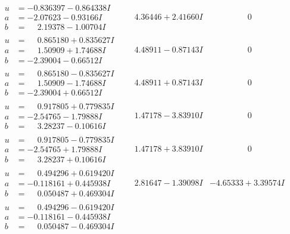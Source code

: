 \documentclass[1p]{elsarticle_modified}
\theoremstyle{definition}
\begin{document}
$$\begin{array}{c|c|c}
\begin{aligned}
u &= -0.836397 - 0.864338 I \\
a &= -2.07623 - 0.93166 I \\
b &= \phantom{-}2.19378 - 1.00704 I\end{aligned}
 & \phantom{-}4.36446 + 2.41660 I & \phantom{-0.000000 } 0 \\ \hline\begin{aligned}
u &= \phantom{-}0.865180 + 0.835627 I \\
a &= \phantom{-}1.50909 + 1.74688 I \\
b &= -2.39004 - 0.66512 I\end{aligned}
 & \phantom{-}4.48911 - 0.87143 I & \phantom{-0.000000 } 0 \\ \hline\begin{aligned}
u &= \phantom{-}0.865180 - 0.835627 I \\
a &= \phantom{-}1.50909 - 1.74688 I \\
b &= -2.39004 + 0.66512 I\end{aligned}
 & \phantom{-}4.48911 + 0.87143 I & \phantom{-0.000000 } 0 \\ \hline\begin{aligned}
u &= \phantom{-}0.917805 + 0.779835 I \\
a &= -2.54765 - 1.79888 I \\
b &= \phantom{-}3.28237 - 0.10616 I\end{aligned}
 & \phantom{-}1.47178 - 3.83910 I & \phantom{-0.000000 } 0 \\ \hline\begin{aligned}
u &= \phantom{-}0.917805 - 0.779835 I \\
a &= -2.54765 + 1.79888 I \\
b &= \phantom{-}3.28237 + 0.10616 I\end{aligned}
 & \phantom{-}1.47178 + 3.83910 I & \phantom{-0.000000 } 0 \\ \hline\begin{aligned}
u &= \phantom{-}0.494296 + 0.619420 I \\
a &= -0.118161 + 0.445938 I \\
b &= \phantom{-}0.050487 + 0.469304 I\end{aligned}
 & \phantom{-}2.81647 - 1.39098 I & -4.65333 + 3.39574 I \\ \hline\begin{aligned}
u &= \phantom{-}0.494296 - 0.619420 I \\
a &= -0.118161 - 0.445938 I \\
b &= \phantom{-}0.050487 - 0.469304 I\end{aligned}

\end{array}$$
\end{document}
